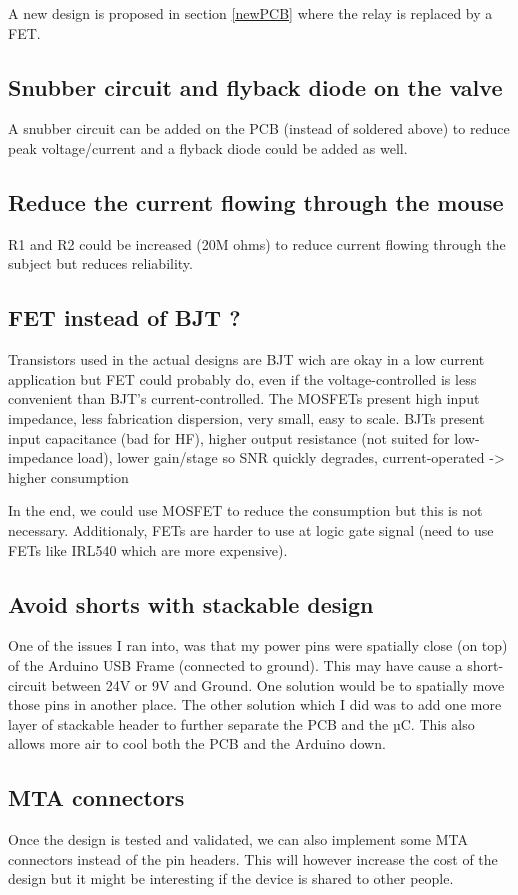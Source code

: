 \documentclass[a4paper]{article}
\begin{document}
A new design is proposed in section \ref{newPCB} where the relay is replaced by a FET.

\subsection{Snubber circuit and flyback diode on the valve}
A snubber circuit can be added on the PCB (instead of soldered above) to reduce peak voltage/current and a flyback diode could be added as well.

\subsection{Reduce the current flowing through the mouse}
R1 and R2 could be increased (20M ohms) to reduce current flowing through the subject but reduces reliability.

\subsection{FET instead of BJT ?}
Transistors used in the actual designs are BJT wich are okay in a low current application but FET could probably do, even if the voltage-controlled is less convenient than BJT's current-controlled.
The MOSFETs present high input impedance, less fabrication dispersion, very small, easy to scale.
BJTs present input capacitance (bad for HF), higher output resistance (not suited for low-impedance load), lower gain/stage so SNR quickly degrades, current-operated -> higher consumption

In the end, we could use MOSFET to reduce the consumption but this is not necessary.
Additionaly, FETs are harder to use at logic gate signal (need to use FETs like IRL540 which are more expensive).

\subsection{Avoid shorts with stackable design}
One of the issues I ran into, was that my power pins were spatially close (on top) of the Arduino USB Frame (connected to ground). This may have cause a short-circuit between 24V or 9V and Ground. One solution would be to spatially move those pins in another place.
The other solution which I did was to add one more layer of stackable header to further separate the PCB and the µC. This also allows more air to cool both the PCB and the Arduino down.

\subsection{MTA connectors}
Once the design is tested and validated, we can also implement some MTA connectors instead of the pin headers. This will however increase the cost of the design but it might be interesting if the device is shared to other people.
\end{document}
